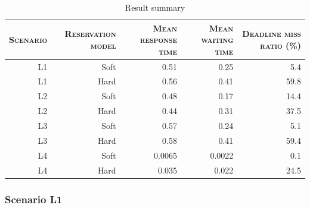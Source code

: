 \documentclass[times, 10pt,twocolumn]{article}
\begin{document}
\begin{table}[t]
  \centering
  \begin{tabular}[t]{rrrrr} \hline
    \textsc{Scenario} & \textsc{Reservation model} & \textsc{Mean
      response time} & \textsc{Mean waiting time} & \textsc{Deadline
      miss ratio (\%)} \\ \hline
    L1 & Soft & 0.51   & 0.25   & 5.4  \\
    L1 & Hard & 0.56   & 0.41   & 59.8 \\
    L2 & Soft & 0.48   & 0.17   & 14.4 \\
    L2 & Hard & 0.44   & 0.31   & 37.5 \\
    L3 & Soft & 0.57   & 0.24   & 5.1  \\
    L3 & Hard & 0.58   & 0.41   & 59.4 \\
    L4 & Soft & 0.0065 & 0.0022 & 0.1  \\
    L4 & Hard & 0.035  & 0.022  & 24.5 \\ \hline    
  \end{tabular}
  \caption{Result summary}
  \label{tab:summary}
\end{table}

\subsubsection{Scenario L1}
\label{sec:scenario-l1}
\end{document}
